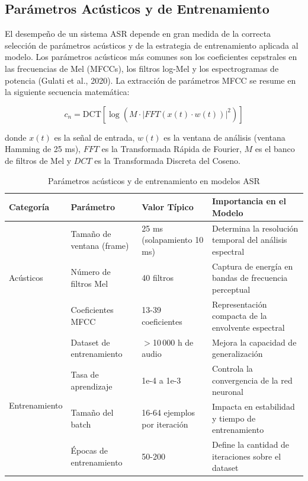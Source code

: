 \documentclass[12pt,a4paper,oneside]{report}
\begin{document}
\subsection{Parámetros Acústicos y de Entrenamiento}

El desempeño de un sistema ASR depende en gran medida de la correcta selección de parámetros acústicos y de la estrategia de entrenamiento aplicada al modelo. Los parámetros acústicos más comunes son los coeficientes cepstrales en las frecuencias de Mel (MFCCs), los filtros log-Mel y los espectrogramas de potencia (Gulati et al., 2020). La extracción de parámetros MFCC se resume en la siguiente secuencia matemática:

\begin{equation}
c_n = \text{DCT}\left[\log\left(M \cdot |FFT(x(t) \cdot w(t))|^2\right)\right]
\end{equation}

donde $x(t)$ es la señal de entrada, $w(t)$ es la ventana de análisis (ventana Hamming de 25 ms), $FFT$ es la Transformada Rápida de Fourier, $M$ es el banco de filtros de Mel y $DCT$ es la Transformada Discreta del Coseno.

\begin{table}[H]
\centering
\caption{Parámetros acústicos y de entrenamiento en modelos ASR}
\begin{tabular}{|p{2.5cm}|p{3.5cm}|p{2.5cm}|p{3.5cm}|}
\hline
\rowcolor{gray!20}
\textbf{Categoría} & \textbf{Parámetro} & \textbf{Valor Típico} & \textbf{Importancia en el Modelo} \\
\hline
\multirow{3}{2.5cm}{Acústicos} & Tamaño de ventana (frame) & 25 ms (solapamiento 10 ms) & Determina la resolución temporal del análisis espectral \\
\cline{2-4}
& Número de filtros Mel & 40 filtros & Captura de energía en bandas de frecuencia perceptual \\
\cline{2-4}
& Coeficientes MFCC & 13-39 coeficientes & Representación compacta de la envolvente espectral \\
\hline
\multirow{4}{2.5cm}{Entrenamiento} & Dataset de entrenamiento & $>$10\,000 h de audio & Mejora la capacidad de generalización \\
\cline{2-4}
& Tasa de aprendizaje & 1e-4 a 1e-3 & Controla la convergencia de la red neuronal \\
\cline{2-4}
& Tamaño del batch & 16-64 ejemplos por iteración & Impacta en estabilidad y tiempo de entrenamiento \\
\cline{2-4}
& Épocas de entrenamiento & 50-200 & Define la cantidad de iteraciones sobre el dataset \\
\hline
\end{tabular}
\label{tab:parametros}
\end{table}
\end{document}
